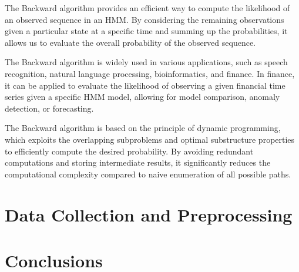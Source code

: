 \documentclass[a4paper,11pt]{article}
\begin{document}
The Backward algorithm provides an efficient way to compute the likelihood of an observed sequence in an HMM. By considering the remaining observations given a particular state at a specific time and summing up the probabilities, it allows us to evaluate the overall probability of the observed sequence.

The Backward algorithm is widely used in various applications, such as speech recognition, natural language processing, bioinformatics, and finance. In finance, it can be applied to evaluate the likelihood of observing a given financial time series given a specific HMM model, allowing for model comparison, anomaly detection, or forecasting.

The Backward algorithm is based on the principle of dynamic programming, which exploits the overlapping subproblems and optimal substructure properties to efficiently compute the desired probability. By avoiding redundant computations and storing intermediate results, it significantly reduces the computational complexity compared to naive enumeration of all possible paths.

\section{Data Collection and Preprocessing}
\label{sec:data_collection}

\section{Conclusions}
\label{sec:conclusions}









\end{document}
